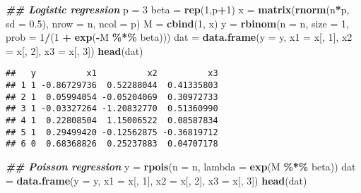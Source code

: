 \documentclass[
]{article}
\newenvironment{Shaded}{\begin{snugshade}}{\end{snugshade}}
\newcommand{\AttributeTok}[1]{\textcolor[rgb]{0.13,0.29,0.53}{#1}}
\newcommand{\DecValTok}[1]{\textcolor[rgb]{0.00,0.00,0.81}{#1}}
\newcommand{\DocumentationTok}[1]{\textcolor[rgb]{0.56,0.35,0.01}{\textbf{\textit{#1}}}}
\newcommand{\FloatTok}[1]{\textcolor[rgb]{0.00,0.00,0.81}{#1}}
\newcommand{\FunctionTok}[1]{\textcolor[rgb]{0.13,0.29,0.53}{\textbf{#1}}}
\newcommand{\NormalTok}[1]{#1}
\newcommand{\OtherTok}[1]{\textcolor[rgb]{0.56,0.35,0.01}{#1}}
\newcommand{\SpecialCharTok}[1]{\textcolor[rgb]{0.81,0.36,0.00}{\textbf{#1}}}
\begin{document}
\begin{Shaded}
\begin{Highlighting}[]
\DocumentationTok{\#\# Logistic regression}
\NormalTok{p }\OtherTok{=} \DecValTok{3}
\NormalTok{beta }\OtherTok{=} \FunctionTok{rep}\NormalTok{(}\DecValTok{1}\NormalTok{,p}\SpecialCharTok{+}\DecValTok{1}\NormalTok{)}
\NormalTok{x }\OtherTok{=} \FunctionTok{matrix}\NormalTok{(}\FunctionTok{rnorm}\NormalTok{(n}\SpecialCharTok{*}\NormalTok{p, }\AttributeTok{sd =} \FloatTok{0.5}\NormalTok{), }\AttributeTok{nrow =}\NormalTok{ n, }\AttributeTok{ncol =}\NormalTok{ p)}
\NormalTok{M }\OtherTok{=} \FunctionTok{cbind}\NormalTok{(}\DecValTok{1}\NormalTok{, x)}
\NormalTok{y }\OtherTok{=} \FunctionTok{rbinom}\NormalTok{(}\AttributeTok{n =}\NormalTok{ n, }\AttributeTok{size =} \DecValTok{1}\NormalTok{, }\AttributeTok{prob =} \DecValTok{1}\SpecialCharTok{/}\NormalTok{(}\DecValTok{1} \SpecialCharTok{+} \FunctionTok{exp}\NormalTok{(}\SpecialCharTok{{-}}\NormalTok{M }\SpecialCharTok{\%*\%}\NormalTok{ beta))) }
\NormalTok{dat }\OtherTok{=} \FunctionTok{data.frame}\NormalTok{(}\AttributeTok{y =}\NormalTok{ y, }
                 \AttributeTok{x1 =}\NormalTok{ x[, }\DecValTok{1}\NormalTok{], }
                 \AttributeTok{x2 =}\NormalTok{ x[, }\DecValTok{2}\NormalTok{], }
                 \AttributeTok{x3 =}\NormalTok{ x[, }\DecValTok{3}\NormalTok{])}
\FunctionTok{head}\NormalTok{(dat)}
\end{Highlighting}
\end{Shaded}

\begin{verbatim}
##   y          x1          x2          x3
## 1 1 -0.86729736  0.52288044  0.41335803
## 2 1  0.05994054 -0.05204069  0.30972733
## 3 1 -0.03327264 -1.20832770  0.51360990
## 4 1  0.22808504  1.15006522  0.08587834
## 5 1  0.29499420 -0.12562875 -0.36819712
## 6 0  0.68368826  0.25237883  0.04707178
\end{verbatim}

\begin{Shaded}
\begin{Highlighting}[]
\DocumentationTok{\#\# Poisson regression}
\NormalTok{y }\OtherTok{=} \FunctionTok{rpois}\NormalTok{(}\AttributeTok{n =}\NormalTok{ n, }\AttributeTok{lambda =} \FunctionTok{exp}\NormalTok{(M }\SpecialCharTok{\%*\%}\NormalTok{ beta)) }
\NormalTok{dat }\OtherTok{=} \FunctionTok{data.frame}\NormalTok{(}\AttributeTok{y =}\NormalTok{ y, }
                 \AttributeTok{x1 =}\NormalTok{ x[, }\DecValTok{1}\NormalTok{], }
                 \AttributeTok{x2 =}\NormalTok{ x[, }\DecValTok{2}\NormalTok{], }
                 \AttributeTok{x3 =}\NormalTok{ x[, }\DecValTok{3}\NormalTok{])}
\FunctionTok{head}\NormalTok{(dat)}
\end{Highlighting}
\end{Shaded}
\end{document}

